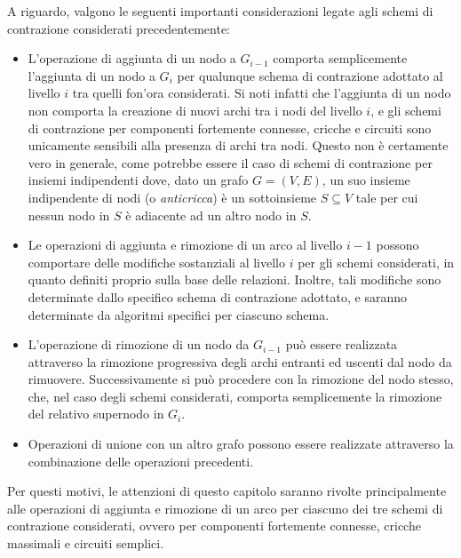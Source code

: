 A riguardo, valgono le seguenti importanti considerazioni legate agli schemi di contrazione considerati precedentemente:
\begin{itemize}
    \item L'operazione di aggiunta di un nodo a $G_{i-1}$ comporta semplicemente l'aggiunta di un nodo a $G_i$ per
    qualunque schema di contrazione adottato al livello $i$ tra quelli fon'ora considerati.
    Si noti infatti che l'aggiunta di un nodo non comporta la creazione di nuovi archi tra i nodi del livello $i$, e
    gli schemi di contrazione per componenti fortemente connesse, cricche e circuiti sono unicamente sensibili alla
    presenza di archi tra nodi.
    Questo non \`e certamente vero in generale, come potrebbe essere il caso di schemi di contrazione per insiemi
    indipendenti dove, dato un grafo $G = (V, E)$, un suo insieme indipendente di nodi (o \textit{anticricca}) è un
    sottoinsieme $S \subseteq V$ tale per cui nessun nodo in $S$ è adiacente ad un altro nodo in $S$.
    \item Le operazioni di aggiunta e rimozione di un arco al livello $i-1$ possono comportare delle modifiche
    sostanziali al livello $i$ per gli schemi considerati, in quanto definiti proprio sulla base delle relazioni.
    Inoltre, tali modifiche sono determinate dallo specifico schema di contrazione adottato, e saranno determinate
    da algoritmi specifici per ciascuno schema.
    \item L'operazione di rimozione di un nodo da $G_{i-1}$ pu\`o essere realizzata attraverso la rimozione
    progressiva degli archi entranti ed uscenti dal nodo da rimuovere.
    Successivamente si pu\`o procedere con la rimozione del nodo stesso, che, nel caso degli schemi considerati,
    comporta semplicemente la rimozione del relativo supernodo in $G_i$.
    \item Operazioni di unione con un altro grafo possono essere realizzate attraverso la combinazione delle
    operazioni precedenti.
\end{itemize}

Per questi motivi, le attenzioni di questo capitolo saranno rivolte principalmente alle operazioni di aggiunta e
rimozione di un arco per ciascuno dei tre schemi di contrazione considerati, ovvero per componenti fortemente connesse,
cricche massimali e circuiti semplici. \newline

